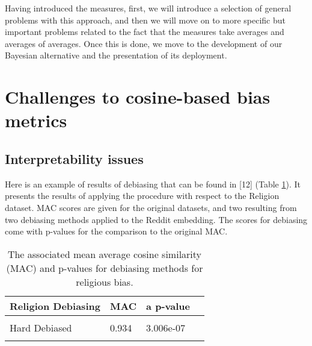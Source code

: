 \documentclass[
  12pt,
  dvipsnames,enabledeprecatedfontcommands]{scrartcl}
\begin{document}
Having introduced the measures, first, we will introduce a selection of
general problems with this approach, and then we will move on to more
specific but important problems related to the fact that the measures
take averages and averages of averages. Once this is done, we move to
the development of our Bayesian alternative and the presentation of its
deployment.

\hypertarget{challenges-to-cosine-based-bias-metrics}{%
\section{Challenges to cosine-based bias
metrics}\label{challenges-to-cosine-based-bias-metrics}}

\label{sec:challenges}

\hypertarget{interpretability-issues}{%
\subsection{Interpretability issues}\label{interpretability-issues}}

\label{subsec:interpretability}

Here is an example of results of debiasing that can be found in {[}12{]}
(Table \ref{tab:religionOriginal2}). It presents the results of applying
the procedure with respect to the Religion dataset. \textsf{MAC} scores
are given for the original datasets, and two resulting from two
debiasing methods applied to the Reddit embedding. The scores for
debiasing come with p-values for the comparison to the original
\textsf{MAC}.

\begin{table}[H]
\footnotesize

\centering

\begin{tabular}[t]{lllr}
\toprule
Religion Debiasing & \textsf{MAC} & a p-value \\
\midrule
\cellcolor{gray!15}{Biased} & \cellcolor{gray!15}{0.859} & \cellcolor{gray!15}{N/A} \\
Hard Debiased & 0.934 & 3.006e-07\\
\cellcolor{gray!15}{Soft Debiased ($\lambda$ = 0.2)} & \cellcolor{gray!15}{0.894} & \cellcolor{gray!15}{0.007} \\
\bottomrule
\end{tabular}

\caption{The associated mean average cosine similarity
(\textsf{MAC}) and p-values for debiasing methods for religious bias.}
\label{tab:religionOriginal2}
\normalsize 
\end{table}
\end{document}
